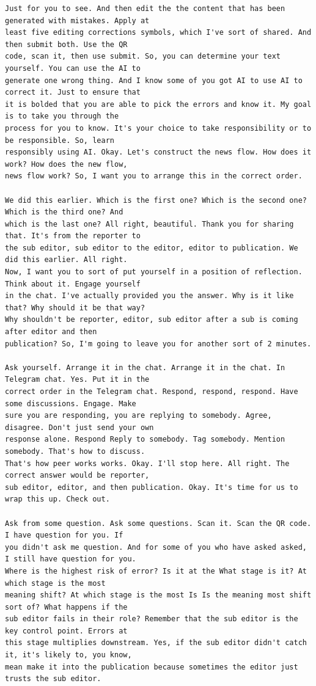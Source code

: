 {\begin{Verbatim}
Just for you to see. And then edit the the content that has been generated with mistakes. Apply at
least five editing corrections symbols, which I've sort of shared. And then submit both. Use the QR
code, scan it, then use submit. So, you can determine your text yourself. You can use the AI to
generate one wrong thing. And I know some of you got AI to use AI to correct it. Just to ensure that
it is bolded that you are able to pick the errors and know it. My goal is to take you through the
process for you to know. It's your choice to take responsibility or to be responsible. So, learn
responsibly using AI. Okay. Let's construct the news flow. How does it work? How does the new flow,
news flow work? So, I want you to arrange this in the correct order.

We did this earlier. Which is the first one? Which is the second one? Which is the third one? And
which is the last one? All right, beautiful. Thank you for sharing that. It's from the reporter to
the sub editor, sub editor to the editor, editor to publication. We did this earlier. All right.
Now, I want you to sort of put yourself in a position of reflection. Think about it. Engage yourself
in the chat. I've actually provided you the answer. Why is it like that? Why should it be that way?
Why shouldn't be reporter, editor, sub editor after a sub is coming after editor and then
publication? So, I'm going to leave you for another sort of 2 minutes.

Ask yourself. Arrange it in the chat. Arrange it in the chat. In Telegram chat. Yes. Put it in the
correct order in the Telegram chat. Respond, respond, respond. Have some discussions. Engage. Make
sure you are responding, you are replying to somebody. Agree, disagree. Don't just send your own
response alone. Respond Reply to somebody. Tag somebody. Mention somebody. That's how to discuss.
That's how peer works works. Okay. I'll stop here. All right. The correct answer would be reporter,
sub editor, editor, and then publication. Okay. It's time for us to wrap this up. Check out.

Ask from some question. Ask some questions. Scan it. Scan the QR code. I have question for you. If
you didn't ask me question. And for some of you who have asked asked, I still have question for you.
Where is the highest risk of error? Is it at the What stage is it? At which stage is the most
meaning shift? At which stage is the most Is Is the meaning most shift sort of? What happens if the
sub editor fails in their role? Remember that the sub editor is the key control point. Errors at
this stage multiplies downstream. Yes, if the sub editor didn't catch it, it's likely to, you know,
mean make it into the publication because sometimes the editor just trusts the sub editor.


\end{Verbatim}}
